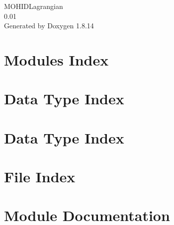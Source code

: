 \documentclass[twoside]{book}
\newcommand{\+}{\discretionary{\mbox{\scriptsize$\hookleftarrow$}}{}{}}
\newcommand{\clearemptydoublepage}{%
  \newpage{\pagestyle{empty}\cleardoublepage}%
}
\begin{document}
\hypersetup{pageanchor=false,
             bookmarksnumbered=true,
             pdfencoding=unicode
            }
\begin{titlepage}
\vspace*{7cm}
\begin{center}%
{\Large M\+O\+H\+I\+D\+Lagrangian \\[1ex]\large 0.\+01 }\\
\vspace*{1cm}
{\large Generated by Doxygen 1.8.14}\\
\end{center}
\end{titlepage}
\clearemptydoublepage
{}
\tableofcontents
\clearemptydoublepage
{}
\hypersetup{pageanchor=true}

\chapter{Modules Index}

\chapter{Data Type Index}

\chapter{Data Type Index}

\chapter{File Index}

\chapter{Module Documentation}


















\end{document}
